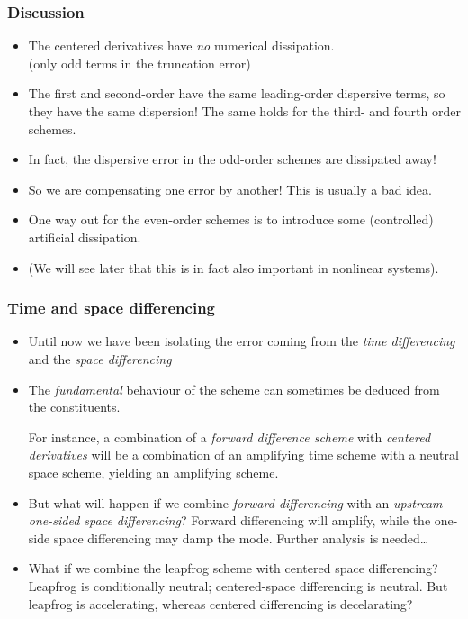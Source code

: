 \documentclass[aspectratio=43,9pt]{beamer}
\begin{document}
%
%
\begin{frame}
	\frametitle{Discussion}
	\vfill\begin{itemize}
		\item The centered derivatives have \emph{no} numerical dissipation.\\
			(only odd terms in the truncation error)\vfill
		\item The first and second-order have the same leading-order dispersive terms, so they have the same dispersion! The same holds for the third- and fourth order schemes.\vspace*{2ex}
		\item In fact, the dispersive error in the odd-order schemes are dissipated away!\vfill
		\item So we are compensating one error by another! This is usually a bad idea.\vfill
		\item One way out for the even-order schemes is to introduce some (controlled) artificial dissipation.\vfill
		\item (We will see later that this is in fact also important in nonlinear systems).
	\end{itemize}\vfill
\end{frame}
%
%
\begin{frame}
	\frametitle{Time and space differencing}
	\vfill\begin{itemize}
		\item Until now we have been isolating the error coming from the \emph{time differencing} and the \emph{space differencing}\vfill
		\item The \emph{fundamental} behaviour of the scheme can sometimes be deduced from the constituents.\vfill
			\par
			For instance, a combination of a \emph{forward difference scheme} with \emph{centered derivatives} will be a combination of an amplifying time scheme with a neutral space scheme, yielding an amplifying scheme.\vfill
		\item But what will happen if we combine \emph{forward differencing} with an \emph{upstream one-sided space differencing}? Forward differencing will amplify, while the one-side space differencing may damp the mode. Further analysis is needed\ldots\vfill
		\item What if we combine the leapfrog scheme with centered space differencing? Leapfrog is conditionally neutral; centered-space differencing is neutral. But leapfrog is accelerating, whereas centered differencing is decelarating?
	\end{itemize}\vfill
\end{frame}
\end{document}
